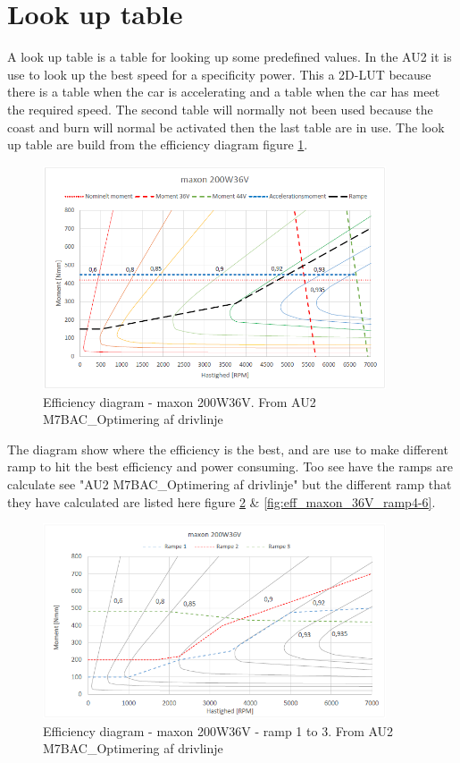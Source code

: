 \newpage
\section{Look up table}

A look up table is a table for looking up some predefined values. In the AU2 it is use to look up the best speed for a specificity power. This a 2D-LUT because there is a table when the car is accelerating and a table when the car has meet the required speed. The second table will normally not been used because the coast and burn will normal be activated then the last table are in use. The look up table are build from the efficiency diagram figure \ref{fig:eff_maxon_36V}. 

\begin{figure}[H]
	\centering
	\includegraphics [width=4in]{Software/Pictures/maxon-200W36V.PNG}
	\caption{Efficiency diagram - maxon 200W36V. From AU2 M7BAC\_Optimering af drivlinje}
	\label{fig:eff_maxon_36V}
\end{figure}

The diagram show where the efficiency is the best, and are use to make different ramp to hit the best efficiency and power consuming. Too see have the ramps are calculate see "AU2 M7BAC\_Optimering af drivlinje" but the different ramp that they have calculated are listed here figure \ref{fig:eff_maxon_36V_ramp1-3} \& \ref{fig:eff_maxon_36V_ramp4-6}.

\begin{figure}[H]
	\centering
	\includegraphics [width=4in]{Software/Pictures/Momentramper-1-3.PNG}
	\caption{Efficiency diagram - maxon 200W36V - ramp 1 to 3. From AU2 M7BAC\_Optimering af drivlinje}
	\label{fig:eff_maxon_36V_ramp1-3}
\end{figure}

